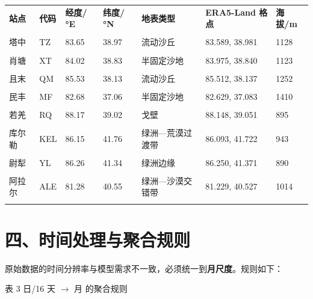 \documentclass[11pt,a4paper]{ctexart}
\begin{document}
\begin{table}[H]\centering\small\setlength{\parskip}{2pt}
\begin{tabularx}{\textwidth}{|X|X|X|X|X|X|X|}
\toprule
\textbf{站点} & \textbf{代码} & \textbf{经度/°E} & \textbf{纬度/°N} & \textbf{地表类型} & \textbf{ERA5-Land 格点} & \textbf{海拔/m} \\\\
\midrule
塔中 & TZ & 83.65 & 38.97 & 流动沙丘 & 83.589, 38.981 & 1128 \\\\
肖塘 & XT & 84.02 & 38.83 & 半固定沙地 & 83.975, 38.840 & 1123 \\\\
且末 & QM & 85.53 & 38.13 & 流动沙丘 & 85.512, 38.137 & 1252 \\\\
民丰 & MF & 82.68 & 37.06 & 半固定沙地 & 82.629, 37.083 & 1410 \\\\
若羌 & RQ & 88.17 & 39.02 & 戈壁 & 88.148, 39.051 & 895 \\\\
库尔勒 & KEL & 86.15 & 41.76 & 绿洲—荒漠过渡带 & 86.093, 41.722 & 943 \\\\
尉犁 & YL & 86.26 & 41.34 & 绿洲边缘 & 86.250, 41.371 & 890 \\\\
阿拉尔 & ALE & 81.28 & 40.55 & 绿洲—沙漠交错带 & 81.229, 40.527 & 1014 \\\\
\bottomrule
\end{tabularx}
\end{table}

\section*{四、时间处理与聚合规则}
原始数据的时间分辨率与模型需求不一致，必须统一到\textbf{月尺度}。规则如下：

表 3  日/16 天 $\to$ 月 的聚合规则
\end{document}
